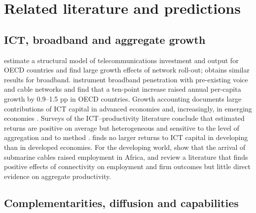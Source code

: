 \documentclass[preprint,12pt,authoryear]{elsarticle}
\begin{document}
\section{Related literature and predictions}\label{sec:lit}

\subsection{ICT, broadband and aggregate growth}

\citet{roller2001telecom} estimate a structural model of telecommunications investment and output for OECD countries and find large growth effects of network roll-out; \citet{koutroumpis2009broadband} obtains similar results for broadband. \citet{czernich2011broadband} instrument broadband penetration with pre-existing voice and cable networks and find that a ten-point increase raised annual per-capita growth by 0.9--1.5 pp in OECD countries. Growth accounting documents large contributions of ICT capital in advanced economies and, increasingly, in emerging economies \citep{jorgenson2008retro,jorgenson2016ict}. Surveys of the ICT--productivity literature conclude that estimated returns are positive on average but heterogeneous and sensitive to the level of aggregation and to method \citep{cardona2013ict,vu2020ict}. \citet{niebel2018ict} finds no larger returns to ICT capital in developing than in developed economies. For the developing world, \citet{hjort2019internet} show that the arrival of submarine cables raised employment in Africa, and \citet{hjort2025connectivity} review a literature that finds positive effects of connectivity on employment and firm outcomes but little direct evidence on aggregate productivity.

\subsection{Complementarities, diffusion and capabilities}
\end{document}

